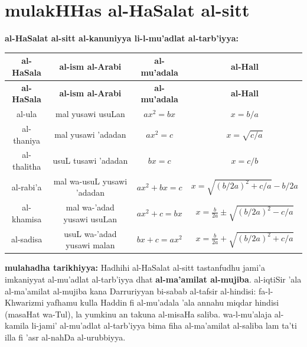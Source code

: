\documentclass[11pt,a4paper]{book}
\begin{document}
\newpage

\appendix

\chapter{mulakHHas al-HaSalat al-sitt}
\label{app:six-cases}

\begin{mathexplain}
\textbf{al-HaSalat al-sitt al-kanuniyya li-l-mu'adlat al-tarb'iyya:}

\begin{center}
\renewcommand{\arraystretch}{1.8}
\begin{longtable}{|c|c|c|c|}
\hline
\textbf{al-HaSala} & \textbf{al-ism al-Arabi} & \textbf{al-mu'adala} & \textbf{al-Hall} \\
\hline
\endfirsthead
\hline
\textbf{al-HaSala} & \textbf{al-ism al-Arabi} & \textbf{al-mu'adala} & \textbf{al-Hall} \\
\hline
\endhead
\hline
\endfoot
al-ula & mal yusawi usuLan & $ax^2 = bx$ & $x = b/a$ \\
\hline
al-thaniya & mal yusawi 'adadan & $ax^2 = c$ & $x = \sqrt{c/a}$ \\
\hline
al-thalitha & usuL tusawi 'adadan & $bx = c$ & $x = c/b$ \\
\hline
al-rabi'a & mal wa-usuL yusawi 'adadan & $ax^2 + bx = c$ & $x = \sqrt{(b/2a)^2 + c/a} - b/2a$ \\
\hline
al-khamisa & mal wa-'adad yusawi usuLan & $ax^2 + c = bx$ & $x = \tfrac{b}{2a} \pm \sqrt{(b/2a)^2 - c/a}$ \\
\hline
al-sadisa & usuL wa-'adad yusawi malan & $bx + c = ax^2$ & $x = \tfrac{b}{2a} + \sqrt{(b/2a)^2 + c/a}$ \\
\hline
\end{longtable}
\end{center}

\vspace{0.5cm}

\textbf{mulahadha tarikhiyya:} Hadhihi al-HaSalat al-sitt tastanfudhu
jami'a imkaniyyat al-mu'adlat al-tarb'iyya dhat \textbf{al-ma'amilat
al-mujiba}. al-iqtiSir 'ala al-ma'amilat al-mujiba kana Darruriyyan
bi-sabab al-tafsir al-hindisi: fa-l-Khwarizmi yafhamu kulla Haddin
fi al-mu'adala 'ala annahu miqdar hindisi (masaHat wa-Tul), la
yumkinu an takuna al-misaHa saliba. wa-l-mu'alaja al-kamila li-jami'
al-mu'adlat al-tarb'iyya bima fiha al-ma'amilat al-saliba lam ta'ti
illa fi 'asr al-nahDa al-urubbiyya.
\end{mathexplain}
\end{document}
